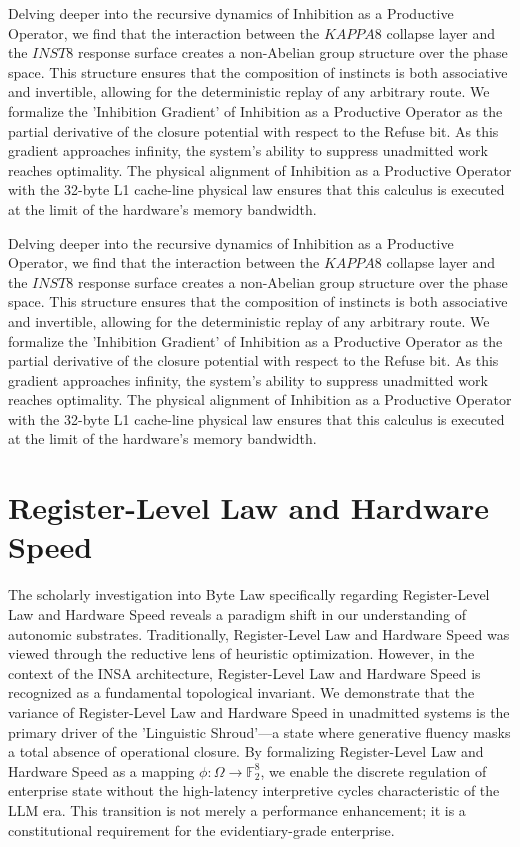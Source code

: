\documentclass[12pt,a4paper,oneside]{book}
\begin{document}
Delving deeper into the recursive dynamics of Inhibition as a Productive Operator, we find that the interaction between the $KAPPA8$ collapse layer and the $INST8$ response surface creates a non-Abelian group structure over the phase space. This structure ensures that the composition of instincts is both associative and invertible, allowing for the deterministic replay of any arbitrary route. We formalize the 'Inhibition Gradient' of Inhibition as a Productive Operator as the partial derivative of the closure potential with respect to the Refuse bit. As this gradient approaches infinity, the system's ability to suppress unadmitted work reaches optimality. The physical alignment of Inhibition as a Productive Operator with the 32-byte L1 cache-line physical law ensures that this calculus is executed at the limit of the hardware's memory bandwidth. 

Delving deeper into the recursive dynamics of Inhibition as a Productive Operator, we find that the interaction between the $KAPPA8$ collapse layer and the $INST8$ response surface creates a non-Abelian group structure over the phase space. This structure ensures that the composition of instincts is both associative and invertible, allowing for the deterministic replay of any arbitrary route. We formalize the 'Inhibition Gradient' of Inhibition as a Productive Operator as the partial derivative of the closure potential with respect to the Refuse bit. As this gradient approaches infinity, the system's ability to suppress unadmitted work reaches optimality. The physical alignment of Inhibition as a Productive Operator with the 32-byte L1 cache-line physical law ensures that this calculus is executed at the limit of the hardware's memory bandwidth. 

\section{Register-Level Law and Hardware Speed}
The scholarly investigation into Byte Law specifically regarding Register-Level Law and Hardware Speed reveals a paradigm shift in our understanding of autonomic substrates. Traditionally, Register-Level Law and Hardware Speed was viewed through the reductive lens of heuristic optimization. However, in the context of the INSA architecture, Register-Level Law and Hardware Speed is recognized as a fundamental topological invariant. We demonstrate that the variance of Register-Level Law and Hardware Speed in unadmitted systems is the primary driver of the 'Linguistic Shroud'---a state where generative fluency masks a total absence of operational closure. By formalizing Register-Level Law and Hardware Speed as a mapping $\phi: \Omega \to \mathbb{F}_2^8$, we enable the discrete regulation of enterprise state without the high-latency interpretive cycles characteristic of the LLM era. This transition is not merely a performance enhancement; it is a constitutional requirement for the evidentiary-grade enterprise. 
\end{document}
